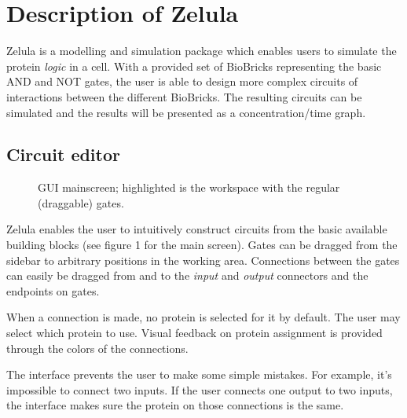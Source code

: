

\newcommand{\screenshotScale}{1.4}


\section{Description of Zelula}
Zelula is a modelling and simulation package which enables users to simulate the protein \textit{logic} in a cell. With a provided set of BioBricks representing the basic AND and NOT gates, the user is able to design more complex circuits of interactions between the different BioBricks. The resulting circuits can be simulated and the results will be presented as a concentration/time graph.


\subsection{Circuit editor}
\begin{figure}[h!]
\centering{}
\caption{GUI mainscreen; highlighted is the workspace with the regular (draggable) gates.}
\end{figure}

\noindent Zelula enables the user to intuitively construct circuits from the basic available building blocks (see figure 1 for the main screen). Gates can be dragged from the sidebar to arbitrary positions in the working area. Connections between the gates can easily be dragged from and to the \textit{input} and \textit{output} connectors and the endpoints on gates. 

When a connection is made, no protein is selected for it by default. The user may select which protein to use. Visual feedback on protein assignment is provided through the colors of the connections.

The interface prevents the user to make some simple mistakes. For example, it's impossible to connect two inputs. If the user connects one output to two inputs, the interface makes sure the protein on those connections is the same.

